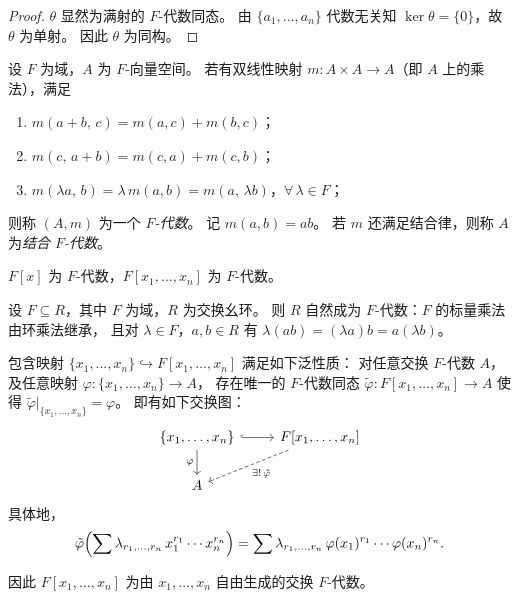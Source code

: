 \documentclass[lang=cn,a4paper,newtx]{elegantbook}
\begin{document}
\begin{proof}
  $\theta$ 显然为满射的 $F$-代数同态。
  由 $\{a_1,\dots,a_n\}$ 代数无关知 $\ker\theta=\{0\}$，故 $\theta$ 为单射。
  因此 $\theta$ 为同构。
\end{proof}

\begin{definition}[$F$-代数]
  设 $F$ 为域，$A$ 为 $F$-向量空间。
  若有双线性映射 $m\colon A\times A\to A$（即 $A$ 上的乘法），满足
  \begin{enumerate}
    \item $m(a+b,\,c)=m(a,c)+m(b,c)$；
    \item $m(c,\,a+b)=m(c,a)+m(c,b)$；
    \item $m(\lambda a,\,b)=\lambda\,m(a,b)=m(a,\,\lambda b)$，$\forall\,\lambda\in F$；
  \end{enumerate}
  则称 $(A,m)$ 为一个 \emph{$F$-代数}。
  记 $m(a,b)=ab$。
  若 $m$ 还满足结合律，则称 $A$ 为\emph{结合 $F$-代数}。
\end{definition}

\begin{example}
  $F[x]$ 为 $F$-代数，$F[x_1,\dots,x_n]$ 为 $F$-代数。
\end{example}

\begin{example}
  设 $F\subseteq R$，其中 $F$ 为域，$R$ 为交换幺环。
  则 $R$ 自然成为 $F$-代数：$F$ 的标量乘法由环乘法继承，
  且对 $\lambda\in F$，$a,b\in R$ 有 $\lambda(ab)=(\lambda a)b=a(\lambda b)$。
\end{example}

\begin{proposition}[多元多项式环的泛性质]
  包含映射 $\{x_1,\dots,x_n\}\hookrightarrow F[x_1,\dots,x_n]$ 满足如下泛性质：
  对任意交换 $F$-代数 $A$，及任意映射 $\varphi\colon\{x_1,\dots,x_n\}\to A$，
  存在唯一的 $F$-代数同态 $\tilde\varphi\colon F[x_1,\dots,x_n]\to A$ 使得 $\tilde\varphi\big|_{\{x_1,\dots,x_n\}}=\varphi$。
  即有如下交换图：
  \[
    \begin{tikzcd}
      \{x_1,\dots,x_n\} \arrow[r,hook] \arrow[d,"\varphi"'] & F[x_1,\dots,x_n] \arrow[dl,dashed,"\exists!\,\tilde\varphi"] \\
      A
    \end{tikzcd}
  \]
  具体地，
  \[
    \tilde\varphi\Bigl(\sum\lambda_{r_1,\dots,r_n}\,x_1^{r_1}\cdots x_n^{r_n}\Bigr)
    =\sum\lambda_{r_1,\dots,r_n}\,\varphi(x_1)^{r_1}\cdots\varphi(x_n)^{r_n}.
  \]
\end{proposition}

\begin{remark}
  因此 $F[x_1,\dots,x_n]$ 为由 $x_1,\dots,x_n$ 自由生成的交换 $F$-代数。
\end{remark}
\end{document}
